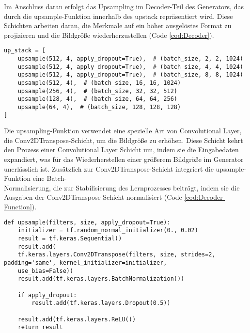 Im Anschluss daran erfolgt das Upsampling im Decoder-Teil des Generators, das durch die upsample-Funktion innerhalb des upstack repräsentiert wird. Diese Schichten arbeiten daran, die Merkmale auf ein höher ausgelöstes Format zu projizieren und die Bildgröße wiederherzustellen (Code \ref{cod:Decoder}).

\begin{lstlisting}[language=pyhaff, caption={Upsampling-Schritt in Pix2Pix}, label={cod:Decoder}]
up_stack = [
	upsample(512, 4, apply_dropout=True),  # (batch_size, 2, 2, 1024)
	upsample(512, 4, apply_dropout=True),  # (batch_size, 4, 4, 1024)
	upsample(512, 4, apply_dropout=True),  # (batch_size, 8, 8, 1024)
	upsample(512, 4),  # (batch_size, 16, 16, 1024)
	upsample(256, 4),  # (batch_size, 32, 32, 512)
	upsample(128, 4),  # (batch_size, 64, 64, 256)
	upsample(64, 4),  # (batch_size, 128, 128, 128)
]
\end{lstlisting}

Die upsampling-Funktion verwendet eine spezielle Art von Convolutional Layer, die Conv2DTranspose-Schicht, um die Bildgröße zu erhöhen. Diese Schicht kehrt den Prozess einer Convolutional Layer Schicht um, indem sie die Eingabedaten expandiert, was für das Wiederherstellen einer größerem Bildgröße im Generator unerlässlich ist. Zusätzlich zur Conv2DTranspose-Schicht integriert die upsample-Funktion eine Batch-\\Normalisierung, die zur Stabilisierung des Lernprozesses beiträgt, indem sie die Ausgaben der Conv2DTranspose-Schicht normalisiert (Code \ref{cod:Decoder-Function}). 

\begin{lstlisting}[language=pyhaff, caption={Upsampling-Schritt in Pix2Pix}, label={cod:Decoder-Function}]
def upsample(filters, size, apply_dropout=True):
	initializer = tf.random_normal_initializer(0., 0.02)
	result = tf.keras.Sequential()
	result.add(
	tf.keras.layers.Conv2DTranspose(filters, size, strides=2, padding='same', kernel_initializer=initializer, 
	use_bias=False))
	result.add(tf.keras.layers.BatchNormalization())
	
	if apply_dropout:
		result.add(tf.keras.layers.Dropout(0.5))
	
	result.add(tf.keras.layers.ReLU())
	return result
\end{lstlisting} 

